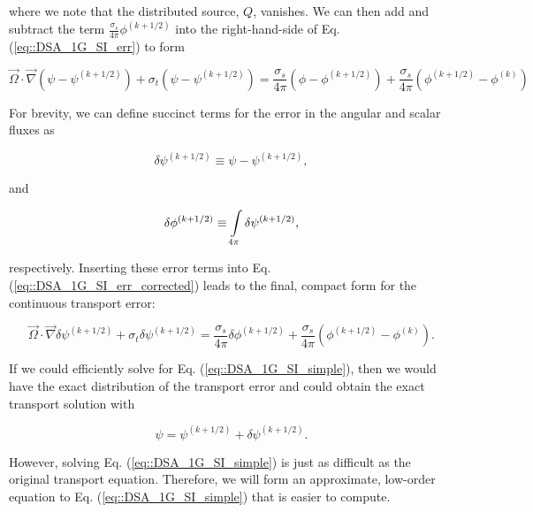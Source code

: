\noindent where we note that the distributed source, $Q$, vanishes. We can then add and subtract the term $ \frac{ \sigma_s}{4 \pi} \phi^{(k+1/2)}$ into the right-hand-side of Eq. (\ref{eq::DSA_1G_SI_err}) to form 

\begin{equation}
\label{eq::DSA_1G_SI_err_corrected}
\vec{\Omega} \cdot \vec{\nabla} \left( \psi - \psi^{(k+1/2)} \right) + \sigma_t \left( \psi -  \psi^{(k+1/2)}\right) =  \frac{ \sigma_s}{4 \pi} \left( \phi -  \phi^{(k+1/2)}\right) +  \frac{ \sigma_s}{4 \pi} \left( \phi^{(k+1/2)} -  \phi^{(k)}\right)  
\end{equation}

\noindent For brevity, we can define succinct terms for the error in the angular and scalar fluxes as

\begin{equation}
\label{eq::DSA_1G_psierr_term}
\delta \psi^{(k+1/2)} \equiv  \psi - \psi^{(k+1/2)}  ,
\end{equation}

\noindent and

\begin{equation}
\label{eq::DSA_1G_phierr_term}
 \delta \phi^{(k+1/2)} \equiv \int\displaylimits_{4 \pi} \delta \psi^{(k+1/2)} ,
\end{equation}

\noindent respectively. Inserting these error terms into Eq. (\ref{eq::DSA_1G_SI_err_corrected}) leads to the final, compact form for the continuous transport error:

\begin{equation}
\label{eq::DSA_1G_SI_simple}
\vec{\Omega} \cdot \vec{\nabla} \delta \psi^{(k+1/2)} + \sigma_t \delta \psi^{(k+1/2)} =   \frac{ \sigma_s}{4 \pi} \delta \phi^{(k+1/2)}+  \frac{ \sigma_s}{4 \pi} \left( \phi^{(k+1/2)} -  \phi^{(k)}\right)   .
\end{equation}

\noindent If we could efficiently solve for Eq. (\ref{eq::DSA_1G_SI_simple}), then we would have the exact distribution of the transport error and could obtain the exact transport solution with 

\begin{equation}
\label{eq::DSA_1G_exact_update}
\psi = \psi^{(k+1/2)} + \delta \psi^{(k+1/2)} .
\end{equation}

\noindent However, solving Eq. (\ref{eq::DSA_1G_SI_simple}) is just as difficult as the original transport equation. Therefore, we will form an approximate, low-order equation to Eq. (\ref{eq::DSA_1G_SI_simple}) that is easier to compute.

